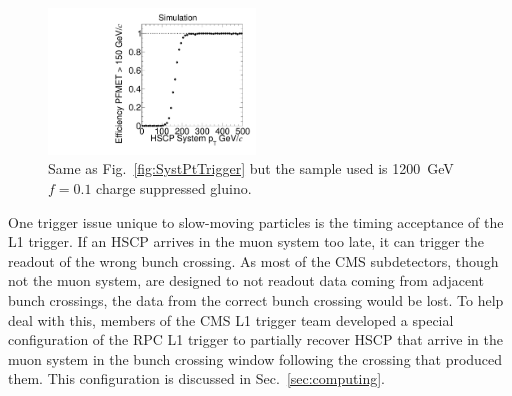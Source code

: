 \begin{figure}
\begin{center}
      \includegraphics[clip=true, trim=0.0cm 0cm 3.0cm 0cm, width=0.49\textwidth]{figures/search/Gluino_8TeV_M1200N_f10SystPtEff}
      \caption[Comparison of di-HSCP system $\phi$ and \pt\ with online PFMET for a 1200~GeV
Gluino $f=0.1$ charge suppressed sample in events with at least 150~GeV of online PFMET]
      {Same as Fig.~\ref{fig:SystPtTrigger} but the sample used is 1200~GeV $f=0.1$ charge suppressed gluino.
        }
      \label{fig:SystPtTriggerN}
  \end{center}
\end{figure}

One trigger issue unique to slow-moving particles is the timing acceptance of the L1 trigger. If an HSCP arrives in the muon system too late, it can trigger the
readout of the wrong bunch crossing. As most of the CMS subdetectors, though not the muon system, are designed to not readout data coming from adjacent bunch crossings,
the data from the correct bunch crossing would be lost. To help deal with this, members of the CMS L1 trigger team developed a special configuration of the
RPC L1 trigger to partially recover HSCP that arrive in the muon system in the bunch crossing window following the crossing that produced them.
This configuration is discussed in Sec.~\ref{sec:computing}.


